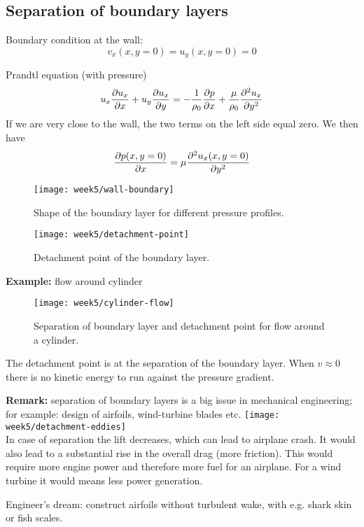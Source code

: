 \subsection{Separation of boundary layers}
Boundary condition at the wall:
\begin{equation}
v_x(x,y=0) = u_y(x,y=0)=0
\end{equation}

Prandtl equation (with pressure)
\begin{equation}
u_x\frac{\partial u_x}{\partial x}+u_y\frac{\partial u_x}{\partial y} = -\frac{1}{\rho_0}\frac{\partial p}{\partial x}+\frac{\mu}{\rho_0}\frac{\partial^2 u_x}{\partial y^2}
\end{equation}
If we are very close to the wall, the two terms on the left side equal zero. We then have
\begin{equation}
\frac{\partial p(x,y=0)}{\partial x}=\mu\frac{\partial^2 u_x(x,y=0)}{\partial y^2}
\end{equation}

\begin{figure}[!h]
    \centering
    \texttt{[image: week5/wall-boundary]}\\
    \caption{Shape of the boundary layer for different pressure profiles.}
    \label{fig:wall-boundary}
\end{figure}

\begin{figure}[!h]
    \centering
    \texttt{[image: week5/detachment-point]}\\
    \caption{Detachment point of the boundary layer.}
    \label{fig:detachment-point}
\end{figure}

\newpage
\textbf{Example:} flow around cylinder

\begin{figure}[!h]
    \centering
    \texttt{[image: week5/cylinder-flow]}\\
    \caption{Separation of boundary layer and detachment point for flow around a cylinder.}
    \label{fig:cylinder-flow}
\end{figure}

The detachment point is at the separation of the boundary layer. When $v\approx0$ there is no kinetic energy to run against the pressure gradient.

\begin{framed}
\textbf{Remark:} separation of boundary layers is a big issue in mechanical engineering; for example: design of airfoils, wind-turbine blades etc.
{\center
\texttt{[image: week5/detachment-eddies]}\\
}
In case of separation the lift decreases, which can lead to airplane crash. It would also lead to a substantial rise in the overall drag (more friction). This would require more engine power and therefore more fuel for an airplane. For a wind turbine it would means less power generation.

Engineer's dream: construct airfoils without turbulent wake, with e.g. shark skin or fish scales.
\end{framed}


